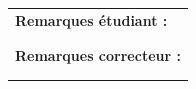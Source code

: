 \documentclass[a4paper,11pt]{article}
\begin{document}
\vspace{1 cm}

\begin{table}[h!]
\centering
\renewcommand{\arraystretch}{1.4} %
\begin{tabular}{|p{15cm}|}
\hline
\textbf{Remarques étudiant :}    \\
 \\
 \\
\hline
\textbf{Remarques correcteur :}  \\
 \\
 \\
\hline
\end{tabular}
\end{table}
\end{document}
